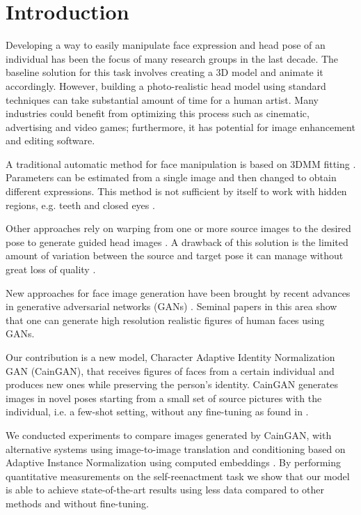 \documentclass[11pt,a4paper]{article}
\begin{document}
\section{Introduction}
Developing a way to easily manipulate face expression and head pose of an individual has been the focus of many research groups in the last decade. The baseline solution for this task involves creating a 3D model and animate it accordingly. However, building a photo-realistic head model using standard techniques can take substantial amount of time for a human artist. Many industries could benefit from optimizing this process such as cinematic, advertising and video games; furthermore, it has potential for image enhancement and editing software. 

A traditional automatic method for face manipulation is based on 3DMM fitting \cite{Blanz:1999:MMS:311535.311556}. Parameters can be estimated from a single image and then changed to obtain different expressions. This method is not sufficient by itself to work with hidden regions, e.g. teeth and closed eyes \cite{yuan2019face}.

Other approaches rely on warping from one or more source images to the desired pose to generate guided head images \cite{Wiles18}. A drawback of this solution is the limited amount of variation between the source and target pose it can manage without great loss of quality \cite{zakharov2019fewshot}.

New approaches for face image generation have been brought by recent advances in generative adversarial networks (GANs) \cite{NIPS2014_5423}. Seminal papers in this area \cite{karras2018progressive,tero2018style} show that one can generate high resolution realistic figures of human faces using GANs.

Our contribution is a new model, Character Adaptive Identity Normalization GAN (CainGAN), that receives figures of faces from a certain individual and produces new ones while preserving the person's identity. CainGAN generates images in novel poses starting from a small set of source pictures with the individual, i.e. a few-shot setting, without any fine-tuning as found in \cite{finn2017model,zakharov2019fewshot}.

We conducted experiments to compare images generated by CainGAN,  with alternative systems using image-to-image translation \cite{pix2pix2017,wang2018pix2pixHD} and conditioning based on Adaptive Instance Normalization \cite{huang2017adain} using computed embeddings \cite{zakharov2019fewshot}. By performing quantitative measurements on the self-reenactment task we show that our model is able to achieve state-of-the-art results using less data compared to other methods and without fine-tuning.  
\end{document}
